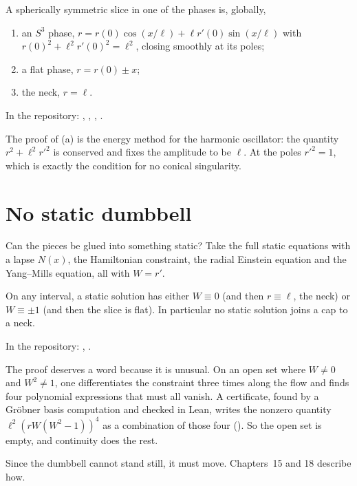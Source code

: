 \begin{theorem}\proved\label{thm:phases}
A spherically symmetric slice in one of the phases is, globally,
\begin{enumerate}[label=(\alph*)]
\item an $S^3$ phase, $r=r(0)\cos(x/\ell)+\ell r'(0)\sin(x/\ell)$ with $r(0)^2+\ell^2r'(0)^2=\ell^2$, closing smoothly at its poles;
\item a flat phase, $r=r(0)\pm x$;
\item the neck, $r=\ell$.
\end{enumerate}
\end{theorem}
\noindent In the repository: , , , .

The proof of (a) is the energy method for the harmonic oscillator: the quantity $r^2+\ell^2r'^2$ is conserved and fixes the amplitude to be $\ell$. At the poles $r'^2=1$, which is exactly the condition for no conical singularity.

\section{No static dumbbell}

Can the pieces be glued into something static? Take the full static equations with a lapse $N(x)$, the Hamiltonian constraint, the radial Einstein equation and the Yang--Mills equation, all with $W=r'$.

\begin{theorem}\proved\negative\label{thm:nostatic}
On any interval, a static solution has either $W\equiv0$ (and then $r\equiv\ell$, the neck) or $W\equiv\pm1$ (and then the slice is flat). In particular no static solution joins a cap to a neck.
\end{theorem}
\noindent In the repository: , .

The proof deserves a word because it is unusual. On an open set where $W\ne0$ and $W^2\ne1$, one differentiates the constraint three times along the flow and finds four polynomial expressions that must all vanish. A certificate, found by a Gr\"obner basis computation and checked in Lean, writes the nonzero quantity $\ell^2(rW(W^2-1))^4$ as a combination of those four (). So the open set is empty, and continuity does the rest.

Since the dumbbell cannot stand still, it must move. Chapters~15 and 18 describe how.

